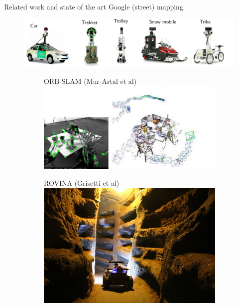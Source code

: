 \documentclass[11pt]{beamer}
\begin{document}
\begin{frame}{Related work and state of the art}
Google (street) mapping
\begin{figure}[!htb]
\centering
\includegraphics[width=\textwidth]{figures/introduction/google_fleet.pdf}
\vspace{10pt}
\begin{subfigure}[b]{0.45\textwidth}
ORB-SLAM (Mur-Artal et al)
 \includegraphics[width=\textwidth]{figures/introduction/ORB_SLAM.pdf}
\end{subfigure}
\hfill
\begin{subfigure}[b]{0.4\textwidth}
ROVINA (Grisetti et al)
 \includegraphics[width=\textwidth]{figures/introduction/ROVINA.jpg}
\end{subfigure}
\end{figure}
\end{frame}
\end{document}

